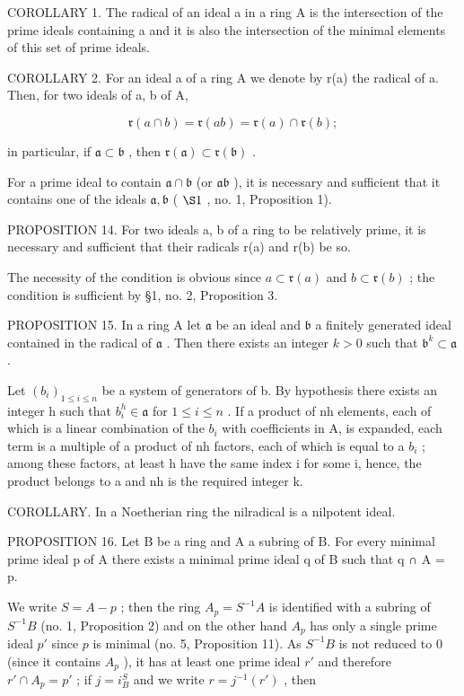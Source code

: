 COROLLARY 1. The radical of an ideal a in a ring A is the intersection of the prime ideals containing a and it is also the intersection of the minimal elements of this set of prime ideals.

COROLLARY 2. For an ideal a of a ring A we denote by r(a) the radical of a. Then, for two ideals of a, b of A,

\[
\mathfrak {r} (a \cap b) = \mathfrak {r} (a b) = \mathfrak {r} (a) \cap \mathfrak {r} (b);
\]

in particular, if \(\mathfrak{a} \subset \mathfrak{b}\) , then \(\mathfrak{r}(\mathfrak{a}) \subset \mathfrak{r}(\mathfrak{b})\) .

For a prime ideal to contain \(\mathfrak{a} \cap \mathfrak{b}\) (or \(\mathfrak{ab}\) ), it is necessary and sufficient that it contains one of the ideals \(\mathfrak{a}, \mathfrak{b}\) ( \(\S 1\) , no. 1, Proposition 1).

PROPOSITION 14. For two ideals a, b of a ring to be relatively prime, it is necessary and sufficient that their radicals r(a) and r(b) be so.

The necessity of the condition is obvious since \(a \subset \mathfrak{r}(a)\) and \(b \subset \mathfrak{r}(b)\) ; the condition is sufficient by §1, no. 2, Proposition 3.

PROPOSITION 15. In a ring A let \(\mathfrak{a}\) be an ideal and \(\mathfrak{b}\) a finitely generated ideal contained in the radical of \(\mathfrak{a}\) . Then there exists an integer \(k > 0\) such that \(\mathfrak{b}^k \subset \mathfrak{a}\) .

Let \((b_{i})_{1\leqslant i\leqslant n}\) be a system of generators of b. By hypothesis there exists an integer h such that \(b_{i}^{h}\in\mathfrak{a}\) for \(1\leqslant i\leqslant n\) . If a product of nh elements, each of which is a linear combination of the \(b_{i}\) with coefficients in A, is expanded, each term is a multiple of a product of nh factors, each of which is equal to a \(b_{i}\) ; among these factors, at least h have the same index i for some i, hence, the product belongs to a and nh is the required integer k.

COROLLARY. In a Noetherian ring the nilradical is a nilpotent ideal.

PROPOSITION 16. Let B be a ring and A a subring of B. For every minimal prime ideal p of A there exists a minimal prime ideal q of B such that q ∩ A = p.

We write \(S = A - p\) ; then the ring \(A_p = S^{-1}A\) is identified with a subring of \(S^{-1}B\) (no. 1, Proposition 2) and on the other hand \(A_p\) has only a single prime ideal \(p'\) since \(p\) is minimal (no. 5, Proposition 11). As \(S^{-1}B\) is not reduced to 0 (since it contains \(A_p\) ), it has at least one prime ideal \(r'\) and therefore \(r' \cap A_p = p'\) ; if \(j = i_B^S\) and we write \(r = j^{-1}(r')\) , then

